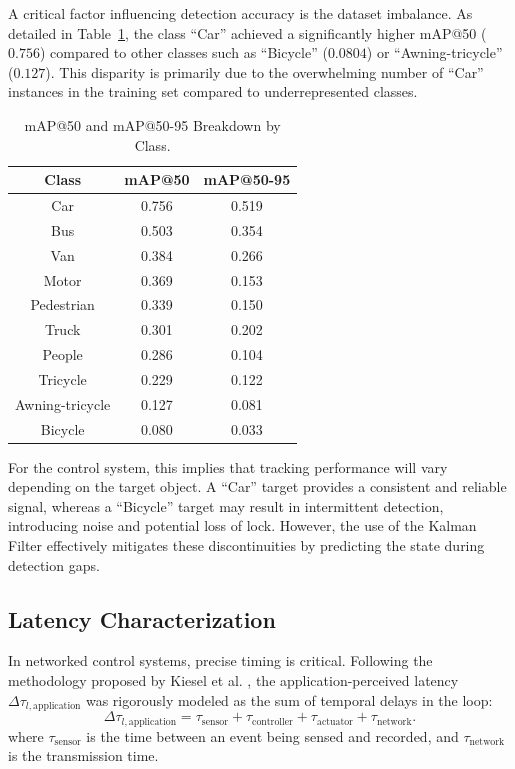 \documentclass[conference]{IEEEtran}
\begin{document}
A critical factor influencing detection accuracy is the dataset imbalance. As detailed in Table~\ref{Breakdown mAP}, the class ``Car'' achieved a significantly higher mAP@50 ($0.756$) compared to other classes such as ``Bicycle'' ($0.0804$) or ``Awning-tricycle'' ($0.127$). This disparity is primarily due to the overwhelming number of ``Car'' instances in the training set compared to underrepresented classes. 

\begin{table}[!b]
    \caption{mAP@50 and mAP@50-95 Breakdown by Class.}
    \label{Breakdown mAP}
    \centering
    \begin{tabular}{|c|c|c|} 
        \hline
        \textbf{Class} & \textbf{mAP@50} & \textbf{mAP@50-95} \\ [0.5ex] 
        \hline\hline
        Car & 0.756 & 0.519 \\
        \hline
        Bus & 0.503 & 0.354 \\
        \hline
        Van & 0.384 & 0.266 \\
        \hline
        Motor & 0.369 & 0.153 \\
        \hline
        Pedestrian & 0.339 & 0.150 \\ 
        \hline
        Truck & 0.301 & 0.202 \\
        \hline
        People & 0.286 & 0.104 \\
        \hline
        Tricycle & 0.229 & 0.122 \\
        \hline
        Awning-tricycle & 0.127 & 0.081 \\
        \hline
        Bicycle & 0.080 & 0.033 \\
        \hline
    \end{tabular}
\end{table}

For the control system, this implies that tracking performance will vary depending on the target object. A ``Car'' target provides a consistent and reliable signal, whereas a ``Bicycle'' target may result in intermittent detection, introducing noise and potential loss of lock. However, the use of the Kalman Filter effectively mitigates these discontinuities by predicting the state during detection gaps.

\subsection{Latency Characterization}
In networked control systems, precise timing is critical. Following the methodology proposed by Kiesel et al. \cite{KIESEL2022238}, the application-perceived latency $\Delta \tau_{l,\text{application}}$ was rigorously modeled as the sum of temporal delays in the loop:
\begin{equation}
    \Delta \tau_{l,\text{application}} = \tau_{\text{sensor}} + \tau_{\text{controller}} + \tau_{\text{actuator}} + \tau_{\text{network}}.
\end{equation}
where $\tau_{\text{sensor}}$ is the time between an event being sensed and recorded, and $\tau_{\text{network}}$ is the transmission time.
\end{document}
